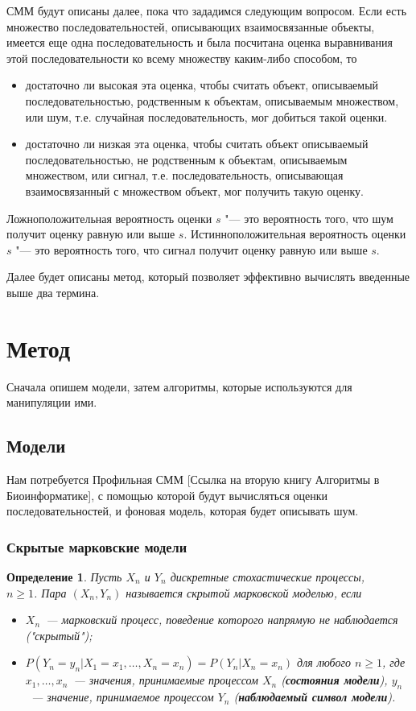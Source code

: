 \documentclass[]{article}
\newtheorem{defenition}{Определение}
\begin{document}
		СММ будут описаны далее, пока что зададимся следующим вопросом. Если есть множество последовательностей, описывающих взаимосвязанные объекты, имеется еще одна последовательность и была посчитана оценка выравнивания этой последовательности ко всему множеству каким-либо способом, то
		\begin{itemize}
			\item достаточно ли высокая эта оценка, чтобы считать объект, описываемый последовательностью, родственным к объектам, описываемым множеством, или шум, т.е. случайная последовательность, мог добиться такой оценки.
			\item достаточно ли низкая эта оценка, чтобы считать объект описываемый последовательностью, не родственным к объектам, описываемым множеством, или сигнал, т.е. последовательность, описывающая взаимосвязанный с множеством объект, мог получить такую оценку. 
		\end{itemize}
		Ложноположительная вероятность оценки $s$ "--- это вероятность того, что шум получит оценку равную или выше $s$. Истинноположительная вероятность оценки $s$ "--- это вероятность того, что сигнал получит оценку равную или выше $s$. 
		
		Далее будет описаны метод, который позволяет эффективно вычислять введенные выше два термина.
		
		\section{Метод}
		Сначала опишем модели, затем алгоритмы, которые используются для манипуляции ими.
		\subsection{Модели}
		Нам потребуется Профильная СММ [Ссылка на вторую книгу Алгоритмы в Биоинформатике], с помощью которой будут вычисляться оценки последовательностей, и фоновая модель, которая будет описывать шум.
		\subsubsection{Скрытые марковские модели}						
			\begin{defenition}
				Пусть $X_{n}$ и $Y_{n}$ дискретные стохастические процессы, \\$n \geq 1$. Пара $(X_{n}, Y_{n})$ называется скрытой марковской моделью, если
				\begin{itemize}
					\item $X_{n}$~--- марковский процесс, поведение которого напрямую не наблюдается ("скрытый");
					\item $P(Y_{n} = y_{n}|X_{1} = x_{1},\dots, X_{n} = x_{n}) = P(Y_{n}|X_{n}=x_{n})$ для любого $n \geq 1$, где $x_{1},\dots,x_{n}$~--- значения, принимаемые процессом  $X_{n}$ (\textbf{состояния модели}), $ y_{n}$~--- значение, принимаемое процессом $Y_{n}$ (\textbf{наблюдаемый символ модели}).
				\end{itemize}
			\end{defenition}
			
\end{document}
